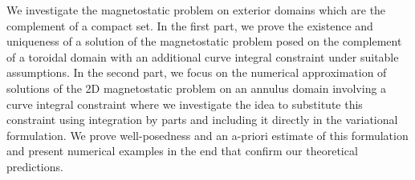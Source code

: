 \documentclass[../master_thesis.tex]{subfiles}
\begin{document}
We investigate the magnetostatic problem on exterior domains 
which are the complement of a compact set. In the first part, we prove 
the existence and uniqueness of a solution of the magnetostatic problem posed on the
complement of a toroidal domain with an additional curve integral constraint 
under suitable assumptions.
In the second part, we focus on the numerical approximation of solutions 
of the 2D magnetostatic problem
on an 
annulus domain involving a curve integral constraint where we investigate 
the idea to substitute this constraint using integration by parts and including it directly 
in the variational formulation. We prove well-posedness and an a-priori estimate 
of this formulation
and present numerical examples in the end that confirm our theoretical 
predictions.
\end{document}
